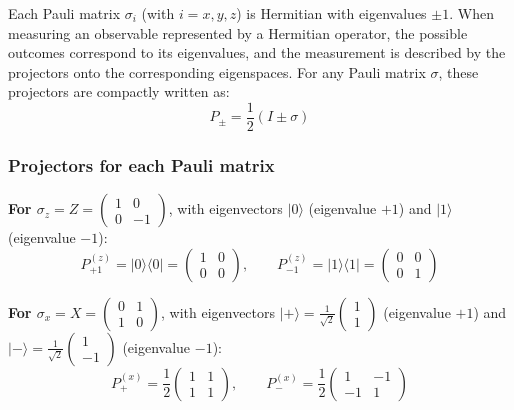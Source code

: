 \documentclass[10pt,a4paper]{article}
\begin{document}
Each Pauli matrix $\sigma_i$ (with $i = x, y, z$) is Hermitian with eigenvalues $\pm 1$.
When measuring an observable represented by a Hermitian operator, the possible outcomes
correspond to its eigenvalues, and the measurement is described by the projectors onto
the corresponding eigenspaces. For any Pauli matrix $\sigma$, these projectors are
compactly written as:
\begin{equation}
    P_{\pm} = \frac{1}{2}(I \pm \sigma)
\end{equation}

\subsubsection*{Projectors for each Pauli matrix}

\textbf{For $\sigma_z = Z = \begin{pmatrix} 1 & 0 \\ 0 & -1 \end{pmatrix}$},
with eigenvectors $|0\rangle$ (eigenvalue $+1$) and $|1\rangle$ (eigenvalue $-1$):
\begin{equation}
    P_{+1}^{(z)} = |0\rangle\langle 0| = \begin{pmatrix} 1 & 0 \\ 0 & 0 \end{pmatrix}, \qquad
    P_{-1}^{(z)} = |1\rangle\langle 1| = \begin{pmatrix} 0 & 0 \\ 0 & 1 \end{pmatrix}
\end{equation}

\textbf{For $\sigma_x = X = \begin{pmatrix} 0 & 1 \\ 1 & 0 \end{pmatrix}$},
with eigenvectors $|{+}\rangle = \frac{1}{\sqrt{2}}\begin{pmatrix}1\\1\end{pmatrix}$ (eigenvalue $+1$)
and $|{-}\rangle = \frac{1}{\sqrt{2}}\begin{pmatrix}1\\-1\end{pmatrix}$ (eigenvalue $-1$):
\begin{equation}
    P_{+}^{(x)} = \frac{1}{2}\begin{pmatrix} 1 & 1 \\ 1 & 1 \end{pmatrix}, \qquad
    P_{-}^{(x)} = \frac{1}{2}\begin{pmatrix} 1 & -1 \\ -1 & 1 \end{pmatrix}
\end{equation}
\end{document}
